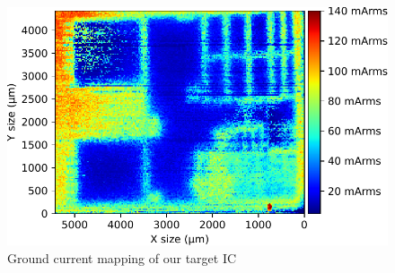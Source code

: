 
\begin{figure}[h]
	\centering
	\includegraphics[width=\columnwidth]{./figures/pos_neg_IGND.pdf}
	\caption{Ground current mapping of our target IC}
	\label{stm_ignd}
\end{figure}
